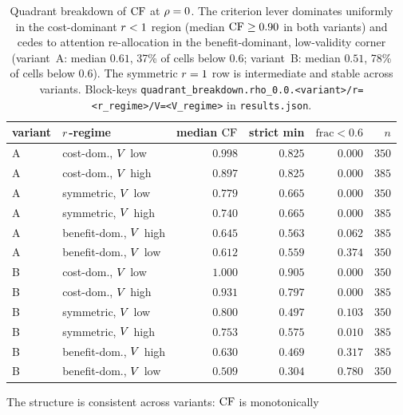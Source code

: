 \begin{table}[t]
  \centering
  \small
  \begin{tabular}{l l r r r r}
    \toprule
    variant & $r$-regime &
    median $\mathrm{CF}$ & strict min &
    $\mathrm{frac}\!<\!0.6$ & $n$\\
    \midrule
    A & cost-dom., $V$ low   & $0.998$ & $0.825$ & $0.000$ & $350$\\
    A & cost-dom., $V$ high  & $0.897$ & $0.825$ & $0.000$ & $385$\\
    A & symmetric, $V$ low   & $0.779$ & $0.665$ & $0.000$ & $350$\\
    A & symmetric, $V$ high  & $0.740$ & $0.665$ & $0.000$ & $385$\\
    A & benefit-dom., $V$ high & $0.645$ & $0.563$ & $0.062$ & $385$\\
    A & benefit-dom., $V$ low  & $\mathbf{0.612}$ & $\mathbf{0.559}$
                                    & $\mathbf{0.374}$ & $350$\\
    \midrule
    B & cost-dom., $V$ low   & $1.000$ & $0.905$ & $0.000$ & $350$\\
    B & cost-dom., $V$ high  & $0.931$ & $0.797$ & $0.000$ & $385$\\
    B & symmetric, $V$ low   & $0.800$ & $0.497$ & $0.103$ & $350$\\
    B & symmetric, $V$ high  & $0.753$ & $0.575$ & $0.010$ & $385$\\
    B & benefit-dom., $V$ high & $0.630$ & $0.469$ & $0.317$ & $385$\\
    B & benefit-dom., $V$ low  & $\mathbf{0.509}$ & $\mathbf{0.304}$
                                    & $\mathbf{0.780}$ & $350$\\
    \bottomrule
  \end{tabular}
  \caption{Quadrant breakdown of $\mathrm{CF}$ at $\rho = 0$. The
  criterion lever dominates uniformly in the cost-dominant
  $r < 1$ region (median $\mathrm{CF} \ge 0.90$ in both variants) and
  cedes to attention re-allocation in the benefit-dominant,
  low-validity corner (variant~A: median $0.61$, 37\% of cells
  below $0.6$; variant~B: median $0.51$, 78\% of cells below
  $0.6$). The symmetric $r = 1$ row is intermediate and stable
  across variants. Block-keys
  \texttt{quadrant\_breakdown.rho\_0.0.<variant>/r=<r\_regime>/V=<V\_regime>}
  in \texttt{results.json}.}
  \label{tab:cf-quadrants}
\end{table}
%
The structure is consistent across variants: $\mathrm{CF}$ is monotonically
